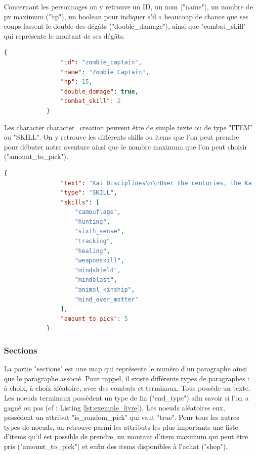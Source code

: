 			Concernant les personnages on y retrouve un ID, un nom ("name"), un nombre de pv maximum ("hp"), un boolean pour indiquer s'il a beaucoup de chance que ses coups fassent le double des dégâts ("double\_damage"), ainsi que "combat\_skill" qui représente le montant de ses dégâts.

			\begin{lstlisting}[gobble=12, language=json, caption=Exemple de personnage]
			{
				"id": "zombie_captain",
				"name": "Zombie Captain",
				"hp": 15,
				"double_damage": true,
				"combat_skill": 2
			}
			\end{lstlisting}

			Les character character\_creation peuvent être de simple texte ou de type "ITEM" ou "SKILL". On y retrouve les différents skills ou items que l'on peut prendre pour débuter notre aventure ainsi que le nombre maximum que l'on peut choisir ("amount\_to\_pick").

			\begin{lstlisting}[gobble=12, language=json, caption=Exemple de character\_creation]
			{
				"text": "Kai Disciplines\n\nOver the centuries, the Kai monks have mastered the skills of the warrior. These skills are known as the Kai Disciplines, [...]",
				"type": "SKILL",
				"skills": [
					"camouflage",
					"hunting",
					"sixth_sense",
					"tracking",
					"healing",
					"weaponskill",
					"mindshield",
					"mindblast",
					"animal_kinship",
					"mind_over_matter"
				],
				"amount_to_pick": 5
			}
			\end{lstlisting}

		\subsubsection{Sections}

			La partie "sections" est une map qui représente le numéro d'un paragraphe ainsi que le paragraphe associé. Pour rappel, il existe différents types de paragraphes : à choix, à choix aléatoire, avec des combats et terminaux. Tous possède un texte. Les noeuds terminaux possèdent un type de fin ("end\_type") afin savoir si l'on a gagné ou pas (cf : Listing \ref{lst:exemple_livre}). Les noeuds aléatoires eux, possèdent un attribut "is\_random\_pick" qui vaut "true". Pour tous les autres types de noeuds, on retrouve parmi les attributs les plus importants une liste d'items qu'il est possible de prendre, un montant d'item maximum qui peut être pris ("amount\_to\_pick") et enfin des items disponibles à l'achat ("shop").

